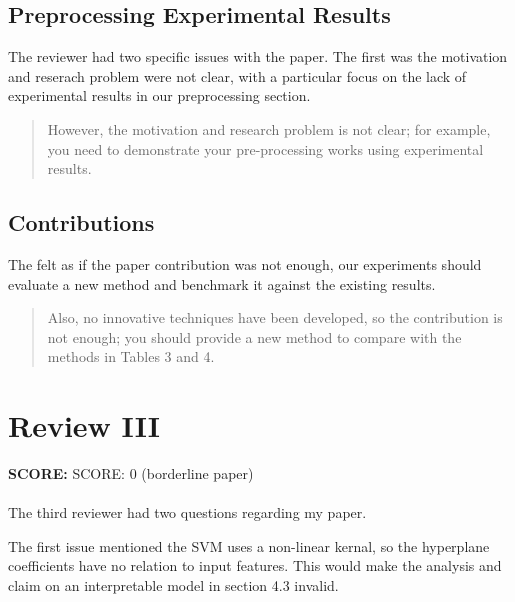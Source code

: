\documentclass[runningheads]{llncs}
\begin{document}
\subsection{Preprocessing Experimental Results}

The reviewer had two specific issues with the paper. 
The first was the motivation and reserach problem were not clear, with a particular focus on the lack of experimental results in our preprocessing section. 

\begin{quote}
  However, the motivation and research problem is not clear; 
  for example, you need to demonstrate your pre-processing works using experimental results. 
\end{quote}

\subsection{Contributions}

The felt as if the paper contribution was not enough, our experiments should evaluate a new method and benchmark it against the existing results. 

\begin{quote}
  Also, no innovative techniques have been developed, so the contribution is not enough; you should provide a new method to compare with the methods in Tables 3 and 4.
\end{quote}

\section{Review III}

\textbf{SCORE:} SCORE: 0 (borderline paper)
\\\\
The third reviewer had two questions regarding my paper. 

The first issue mentioned the SVM uses a non-linear kernal, so the hyperplane coefficients have no relation to input features. This would make the analysis and claim on an interpretable model in section 4.3 invalid. 
\end{document}

